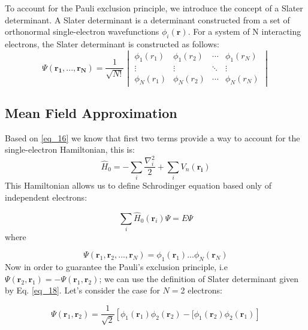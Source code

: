 To account for the Pauli exclusion principle, we introduce the concept of a Slater determinant. A Slater determinant is a determinant constructed from a set of orthonormal single-electron wavefunctions $\phi_i(\mathbf{r})$. For a system of N interacting electrons, the Slater determinant is constructed as follows:
\begin{equation} \label{eq_18}
\Psi(\mathbf{r_1}, ...,\mathbf{r_N})=   \dfrac{1}{\sqrt{N!}}
    \begin{vmatrix}
    \phi_1(r_1) & \phi_1(r_2) & \cdots & \phi_1(r_N) \\
    \vdots & \vdots & \ddots & \vdots \\
    \phi_N(r_1) & \phi_N(r_2) & \cdots & \phi_N(r_N)
    \end{vmatrix}
\end{equation}

\subsection{Mean Field Approximation}
Based on \ref{eq_16} we know that first two terms provide a way to account for the single-electron Hamiltonian, this is:
\begin{equation} \label{eq_19}
    \hat{H}_0 = -\sum_{i}\dfrac{\nabla_{i}^{2}}{2} +\sum_{i}V_{n}(\mathbf{r_i})
\end{equation}
This Hamiltonian allows us to define Schrodinger equation based only of independent electrons:

\begin{equation} \label{eq_2.23a}
	\sum_{i} \hat{H}_{0} (\mathbf{r}_i) \Psi = E \Psi
\end{equation}
where 

\begin{equation}
	\Psi \left( \mathbf{r}_1, \mathbf{r}_2, ..., \mathbf{r}_N \right) = \phi_{1}(\mathbf{r}_1) ... \phi_N(\mathbf{r}_N) 
\end{equation}
Now in order to guarantee the Pauli's exclusion principle, i.e $\Psi(\mathbf{r}_2, \mathbf{r}_1) = - \Psi(\mathbf{r}_1, \mathbf{r}_2)$; we can use the definition of Slater determinant given by Eq. \ref{eq_18}. Let's consider the case for $N=$2 electrons:

\begin{equation} \label{eq_2.25a}
	\Psi(\mathbf{r}_1, \mathbf{r}_2) = \dfrac{1}{\sqrt{2}} \left[\phi_{1}(\mathbf{r}_1)\phi_{2}(\mathbf{r}_2) - [\phi_{1}(\mathbf{r}_2)\phi_{2}(\mathbf{r}_1) \right]
\end{equation}

